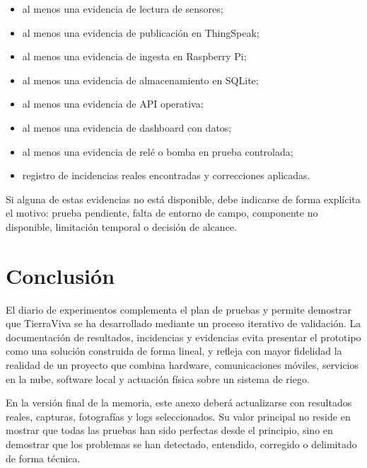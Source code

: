 \begin{itemize}
    \item al menos una evidencia de lectura de sensores;
    \item al menos una evidencia de publicación en ThingSpeak;
    \item al menos una evidencia de ingesta en Raspberry Pi;
    \item al menos una evidencia de almacenamiento en SQLite;
    \item al menos una evidencia de API operativa;
    \item al menos una evidencia de dashboard con datos;
    \item al menos una evidencia de relé o bomba en prueba controlada;
    \item registro de incidencias reales encontradas y correcciones aplicadas.
\end{itemize}

Si alguna de estas evidencias no está disponible, debe indicarse de forma explícita el motivo: prueba pendiente, falta de entorno de campo, componente no disponible, limitación temporal o decisión de alcance.

\section{Conclusión}

El diario de experimentos complementa el plan de pruebas y permite demostrar que TierraViva se ha desarrollado mediante un proceso iterativo de validación. La documentación de resultados, incidencias y evidencias evita presentar el prototipo como una solución construida de forma lineal, y refleja con mayor fidelidad la realidad de un proyecto que combina hardware, comunicaciones móviles, servicios en la nube, software local y actuación física sobre un sistema de riego.

En la versión final de la memoria, este anexo deberá actualizarse con resultados reales, capturas, fotografías y logs seleccionados. Su valor principal no reside en mostrar que todas las pruebas han sido perfectas desde el principio, sino en demostrar que los problemas se han detectado, entendido, corregido o delimitado de forma técnica.